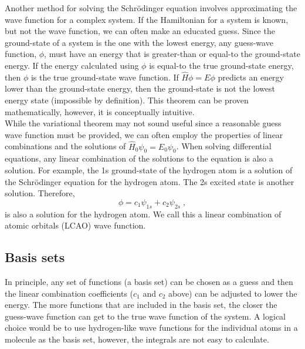 \documentclass[12pt]{report}
\begin{document}
Another method for solving the Schr\"{o}dinger equation involves approximating
the wave function for a complex system.
If the Hamiltonian for a system is known, but not the wave function, we can
often make an educated guess.
Since the ground-state of a system is the one with the lowest energy, any
guess-wave function, $\phi$, must have an energy that is greater-than or
equal-to the ground-state energy.
If the energy calculated using $\phi$ is equal-to the true ground-state
energy, then $\phi$ is the true ground-state wave function.
If $\hat H\phi=E\phi$ predicts an energy lower than the ground-state energy,
then the ground-state is not the lowest energy state (impossible by
definition).
This theorem can be proven mathematically, however, it is conceptually
intuitive. \\

While the variational theorem may not sound useful since a reasonable guess
wave function must be provided, we can often employ the properties of linear
combinations and the solutions of $\hat H_0\psi_0=E_0\psi_0$.
When solving differential equations, any linear combination of the solutions
to the equation is also a solution.
For example, the 1s ground-state of the hydrogen atom is a solution of the
Schr\"{o}dinger equation for the hydrogen atom.
The 2s excited state is another solution.
Therefore,
\begin{equation}
 \phi = c_1\psi_{1s}+c_2\psi_{2s} \; ,
\end{equation}
is also a solution for the hydrogen atom.
We call this a linear combination of atomic orbitals (LCAO) wave function.

\subsection{Basis sets}

In principle, any set of functions (a basis set) can be chosen as a guess and
then the linear combination coefficients ($c_1$ and $c_2$ above) can be
adjusted to lower the energy.
The more functions that are included in the basis set, the closer the
guess-wave function can get to the true wave function of the system.
A logical choice would be to use hydrogen-like wave functions for the
individual atoms in a molecule as the basis set, however, the integrals are
not easy to calculate. \\
\end{document}
